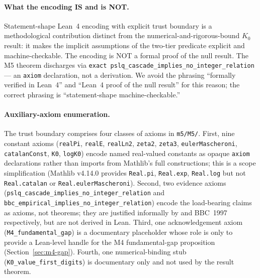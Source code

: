 \documentclass[11pt,a4paper]{article}
\newcommand{\K}{K_{0}}
\begin{document}
\paragraph{What the encoding IS and is NOT.}
Statement-shape Lean~4 encoding with explicit trust boundary is a
methodological contribution distinct from the numerical-and-rigorous-bound
$\K$ result: it makes the implicit assumptions of the two-tier predicate
explicit and machine-checkable.
The encoding is NOT a formal proof of the null result.
The M5 theorem discharges via
\texttt{exact pslq\_cascade\_implies\_no\_integer\_relation}
--- an \texttt{axiom} declaration, not a derivation.
We avoid the phrasing ``formally verified in Lean~4'' and ``Lean~4 proof of
the null result'' for this reason; the correct phrasing is
``statement-shape machine-checkable.''

\paragraph{Auxiliary-axiom enumeration.}
The trust boundary comprises four classes of axioms in
\texttt{m5/M5/}.
First, nine constant axioms (\texttt{realPi}, \texttt{realE},
\texttt{realLn2}, \texttt{zeta2}, \texttt{zeta3},
\texttt{eulerMascheroni}, \texttt{catalanConst}, \texttt{K0}, \texttt{logK0})
encode named real-valued constants as opaque \texttt{axiom} declarations
rather than imports from Mathlib's full constructions; this is a scope
simplification (Mathlib v4.14.0 provides
\texttt{Real.pi}, \texttt{Real.exp}, \texttt{Real.log} but not
\texttt{Real.catalan} or \texttt{Real.eulerMascheroni}).
Second, two evidence axioms (\texttt{pslq\_cascade\_implies\_no\_integer\_relation}
and \texttt{bbc\_empirical\_implies\_no\_integer\_relation}) encode the
load-bearing claims as axioms, not theorems; they are justified
informally by \cite[Theorem~1 + Corollary~2]{fba1999} and BBC~1997
respectively, but are not derived in Lean.
Third, one acknowledgement axiom (\texttt{M4\_fundamental\_gap}) is a
documentary placeholder whose role is only to provide a Lean-level handle
for the M4 fundamental-gap proposition (Section~\ref{sec:m4-gap}).
Fourth, one numerical-binding stub (\texttt{K0\_value\_first\_digits}) is
documentary only and not used by the result theorem.
\end{document}
